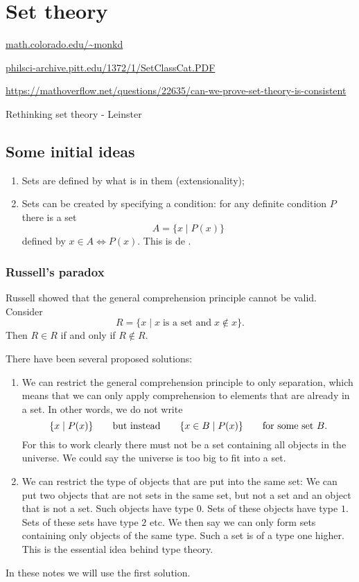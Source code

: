 \chapter{Set theory}
\url{math.colorado.edu/~monkd}

\url{philsci-archive.pitt.edu/1372/1/SetClassCat.PDF}

\url{https://mathoverflow.net/questions/22635/can-we-prove-set-theory-is-consistent}

Rethinking set theory - Leinster




\section{Some initial ideas}
\begin{enumerate}
\item Sets are defined by what is in them (extensionality);
\item Sets can be created by specifying a condition: for any definite condition $P$ there is a set
\[ A = \{x\;|\;P(x)\} \]
defined by $x\in A \iff P(x)$. This is de .
\end{enumerate}
\subsection{Russell's paradox}
Russell showed that the general comprehension principle cannot be valid. Consider
\[ R = \{x\;|\; x\;\text{is a set and}\;x\notin x\}. \]
Then $R\in R$ if and only if $R\notin R$.

There have been several proposed solutions:
\begin{enumerate}
\item We can restrict the general comprehension principle to only separation, which means that we can only apply comprehension to elements that are already in a set. In other words, we do not write
\[ \setbuilder{x}{P(x)} \qquad \text{but instead}\qquad \setbuilder{x\in B}{P(x)}\qquad \text{for some set $B$}. \]
For this to work clearly there must not be a set containing all objects in the universe. We could say the universe is too big to fit into a set.
\item We can restrict the type of objects that are put into the same set: We can put two objects that are not sets in the same set, but not a set and an object that is not a set. Such objects have type $0$. Sets of these objects have type $1$. Sets of these sets have type $2$ etc. We then say we can only form sets containing only objects of the same type. Such a set is of a type one higher. This is the essential idea behind type theory.
\end{enumerate}
In these notes we will use the first solution.

